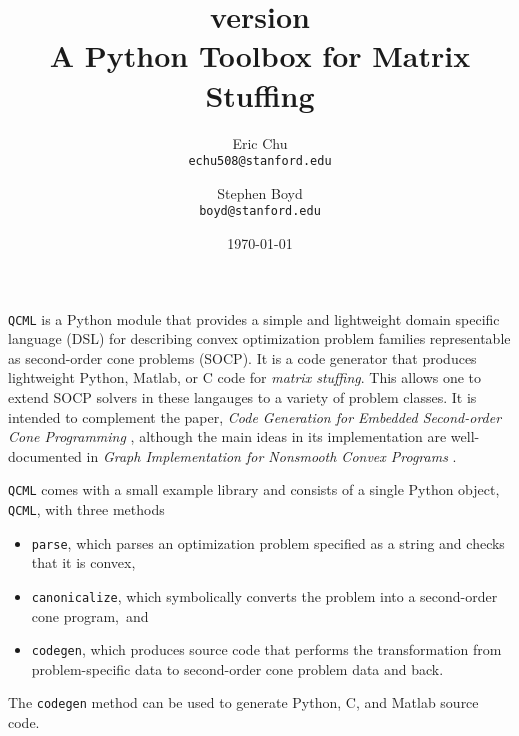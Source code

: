 \documentclass[11pt]{article}
\title{\qcml version \qcmlver \\
A Python Toolbox for Matrix Stuffing}
\author{
Eric Chu\\\texttt{echu508@stanford.edu}
\and
Stephen Boyd\\\texttt{boyd@stanford.edu}
}
\date{\today}
\def\qcml{\texttt{QCML}\xspace}
\begin{document}
  \maketitle
  
\qcml is a Python module that provides a simple and lightweight domain
specific language (DSL) for describing convex optimization problem families
representable as second-order cone problems (SOCP). It is a code generator
that produces lightweight Python, Matlab, or C code for \emph{matrix
stuffing}. This allows one to extend SOCP solvers in these langauges to a 
variety of problem classes. It is intended to complement the paper, 
\emph{Code Generation for Embedded Second-order Cone Programming} \cite{CPD:13}, 
although the main ideas in its
implementation are well-documented in \emph{Graph Implementation for Nonsmooth Convex Programs}
\cite{GB:08}.

\qcml comes with a small example library and consists of a single Python
object, \texttt{QCML}, with three methods
\begin{itemize}
\item \texttt{parse}, which parses an optimization problem specified as a
string and checks that it is convex,
\item \texttt{canonicalize}, which symbolically converts the problem into
a second-order cone program,~and
\item \texttt{codegen}, which produces source code that performs the
transformation from problem-specific data to second-order cone problem data
and back.
\end{itemize}
The \texttt{codegen} method can be used to generate Python, C, and Matlab
source code.
\end{document}
